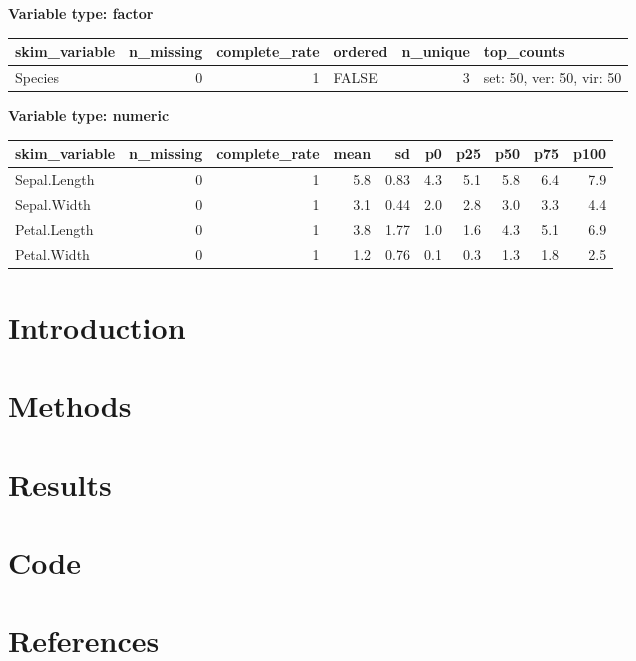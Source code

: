 \documentclass[
  11pt,
]{article}
\author{R.G. Thomas}
\date{2022-11-13}
\begin{document}
{
\setcounter{tocdepth}{2}
\tableofcontents
}
\thispagestyle{fancy}

\textbf{Variable type: factor}

\begin{tabular}{l|r|r|l|r|l}
\hline
skim\_variable & n\_missing & complete\_rate & ordered & n\_unique & top\_counts\\
\hline
Species & 0 & 1 & FALSE & 3 & set: 50, ver: 50, vir: 50\\
\hline
\end{tabular}

\textbf{Variable type: numeric}

\begin{tabular}{l|r|r|r|r|r|r|r|r|r}
\hline
skim\_variable & n\_missing & complete\_rate & mean & sd & p0 & p25 & p50 & p75 & p100\\
\hline
Sepal.Length & 0 & 1 & 5.8 & 0.83 & 4.3 & 5.1 & 5.8 & 6.4 & 7.9\\
\hline
Sepal.Width & 0 & 1 & 3.1 & 0.44 & 2.0 & 2.8 & 3.0 & 3.3 & 4.4\\
\hline
Petal.Length & 0 & 1 & 3.8 & 1.77 & 1.0 & 1.6 & 4.3 & 5.1 & 6.9\\
\hline
Petal.Width & 0 & 1 & 1.2 & 0.76 & 0.1 & 0.3 & 1.3 & 1.8 & 2.5\\
\hline
\end{tabular}

\hypertarget{introduction}{%
\section{Introduction}\label{introduction}}

\hypertarget{methods}{%
\section{Methods}\label{methods}}

\hypertarget{results}{%
\section{Results}\label{results}}

\hypertarget{code}{%
\section{Code}\label{code}}

\hypertarget{references}{%
\section{References}\label{references}}
\end{document}
